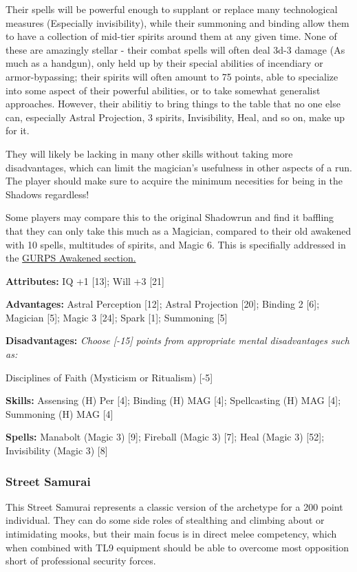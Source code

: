 \begin{multicols}{2}
	Their spells will be powerful enough to supplant or replace many technological measures (Especially invisibility), while their summoning and binding allow them to have a collection of mid-tier spirits around them at any given time. None of these are amazingly stellar - their combat spells will often deal 3d-3 damage (As much as a handgun), only held up by their special abilities of incendiary or armor-bypassing; their spirits will often amount to 75 points, able to specialize into some aspect of their powerful abilities, or to take somewhat generalist approaches. However, their abilitiy to bring things to the table that no one else can, especially Astral Projection, 3 spirits, Invisibility, Heal, and so on, make up for it.
	
	They will likely be lacking in many other skills without taking more disadvantages, which can limit the magician's usefulness in other aspects of a run. The player should make sure to acquire the minimum necesities for being in the Shadows regardless!
	
	Some players may compare this to the original Shadowrun and find it baffling that they can only take this much as a Magician, compared to their old awakened with 10 spells, multitudes of spirits, and Magic 6. This is specifially addressed in the \hyperref[gurps_awakened]{GURPS Awakened section.}
	
	\textbf{Attributes: } IQ +1 [13]; Will +3 [21]
	
	\textbf{Advantages: } Astral Perception [12]; Astral Projection [20]; Binding 2 [6]; Magician [5]; Magic 3 [24]; Spark [1]; Summoning [5]
	
	\textbf{Disadvantages: } \textit{Choose [-15] points from appropriate mental disadvantages such as:}
	
	Disciplines of Faith (Mysticism or Ritualism) [-5]
	
	\textbf{Skills: } Assensing (H) Per [4]; Binding (H) MAG [4]; Spellcasting (H) MAG [4]; Summoning (H) MAG [4]
	
	\textbf{Spells: } Manabolt (Magic 3) [9]; Fireball (Magic 3) [7]; Heal (Magic 3) [52]; Invisibility (Magic 3) [8]
	
	
	\subsubsection{Street Samurai}
	
	This Street Samurai represents a classic version of the archetype for a 200 point individual. They can do some side roles of stealthing and climbing about or intimidating mooks, but their main focus is in direct melee competency, which when combined with TL9 equipment should be able to overcome most opposition short of professional security forces.
	

\end{multicols}
